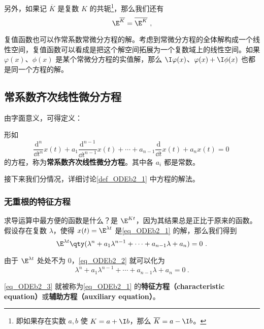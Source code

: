 另外，如果记 $\overline{K}$ 是复数 $K$ 的共轭\footnote{即如果存在实数 $a, b$ 使 $K=a+\I b$，那么 $\overline{K}=a-\I b$。}，那么我们还有
\begin{equation}
\E^{\overline{K}}=\overline{\E^K}~,
\end{equation}

复值函数也可以作常系数常微分方程的解。考虑到常微分方程的全体解构成一个线性空间，复值函数可以看成是把这个解空间拓展为一个复数域上的线性空间。如果 $\varphi(x)$、$\phi(x)$ 是某个常微分方程的实值解，那么 $\I\varphi(x)$、$\varphi(x)+\I \phi(x)$ 也都是同一个方程的解。


\subsection{常系数齐次线性微分方程}



由字面意义，可得定义：
\begin{definition}{}\label{def_ODEb2_1}
形如
\begin{equation}\label{eq_ODEb2_1}
\frac{\mathrm{d}^n}{\dd t^n}x(t)+a_1\frac{\mathrm{d}^{n-1}}{\dd t^{n-1}}x(t)+\cdots+a_{n-1}\frac{\mathrm{d}}{\dd t}x(t)+a_nx(t)=0~
\end{equation}
的方程，称为\textbf{常系数齐次线性微分方程}。其中各 $a_i$ 都是常数。
\end{definition}

接下来我们分情况，详细讨论\autoref{def_ODEb2_1} 中方程的解法。

\subsubsection{无重根的特征方程}


求导运算中最方便的函数是什么？是 $\E^{Kt}$，因为其结果总是正比于原来的函数。假设存在复数 $\lambda$，使得 $x(t)=\E^{\lambda t}$ 是\autoref{eq_ODEb2_1} 的解，那么我们得到
\begin{equation}\label{eq_ODEb2_2}
\E^{\lambda t}\qty(\lambda^n+a_1\lambda^{n-1}+\cdots+a_{n-1}\lambda+a_n)=0~.
\end{equation}

由于 $\E^{\lambda t}$ 处处不为 $0$，\autoref{eq_ODEb2_2} 就可以化为
\begin{equation}\label{eq_ODEb2_3}
\lambda^n+a_1\lambda^{n-1}+\cdots+a_{n-1}\lambda+a_n=0~.
\end{equation}

\autoref{eq_ODEb2_3} 就被称为\autoref{eq_ODEb2_1} 的\textbf{特征方程（characteristic equation）}或\textbf{辅助方程（auxiliary equation）}。

